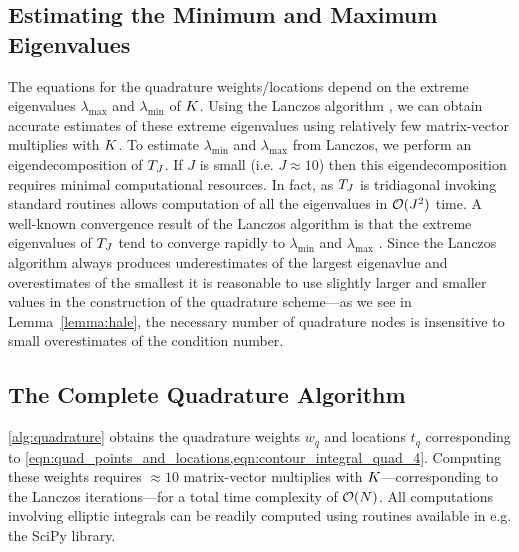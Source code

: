 \subsection{Estimating the Minimum and Maximum Eigenvalues}
The equations for the quadrature weights/locations depend on the extreme eigenvalues $\lambda_\text{max}$ and $\lambda_\text{min}$ of $K$.
Using the Lanczos algorithm \cite{lanczos1950iteration}, we can obtain accurate estimates of these extreme eigenvalues using relatively few matrix-vector multiplies with $K$.
To estimate $\lambda_\text{min}$ and $\lambda_\text{max}$ from Lanczos, we perform an eigendecomposition of $T_J$.
If $J$ is small (i.e. $J \approx 10$) then this eigendecomposition requires minimal computational resources. In fact, as $T_J$ is tridiagonal invoking standard routines allows computation of all the eigenvalues in $\bigo{J^2}$ time.
A well-known convergence result of the Lanczos algorithm is that the extreme eigenvalues of $T_J$ tend to converge rapidly to $\lambda_\text{min}$ and $\lambda_\text{max}$ \citep[e.g.][]{saad2003iterative,golub2012matrix}.
Since the Lanczos algorithm always produces underestimates of the largest eigenavlue and overestimates of the smallest it is reasonable to use slightly larger and smaller values in the construction of the quadrature scheme---as we see in Lemma~\ref{lemma:hale}, the necessary number of quadrature nodes is insensitive to small overestimates of the condition number.


\subsection{The Complete Quadrature Algorithm}
\cref{alg:quadrature} obtains the quadrature weights $w_q$ and locations $t_q$ corresponding to \cref{eqn:quad_points_and_locations,eqn:contour_integral_quad_4}.
Computing these weights requires $\approx 10$ matrix-vector multiplies with $K$---corresponding to the Lanczos iterations---for a total time complexity of $\bigo{N}$.
All computations involving elliptic integrals can be readily computed using routines available in e.g. the SciPy library.



